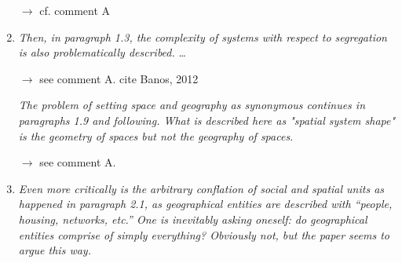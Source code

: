 \documentclass[11pt,a4paper,sans]{moderncv}        %
\begin{document}
\begin{enumerate}
 $\rightarrow$ cf. comment A
 
 \medskip

  

  \item \textit{Then, in paragraph 1.3, the complexity of systems with respect to segregation is also problematically described.} \ldots
  
  $\rightarrow$ see comment A. cite Banos, 2012 

  \medskip

  \textit{The problem of setting space and geography as synonymous continues in paragraphs 1.9 and following. What is described here as "spatial system shape" is the geometry of spaces but not the geography of spaces.}
  
  $\rightarrow$ see comment A. 

  \medskip

  \item \textit{Even more critically is the arbitrary conflation of social and spatial units as happened in paragraph 2.1, as geographical entities are described with “people, housing, networks, etc.” One is inevitably asking oneself: do geographical entities comprise of simply everything? Obviously not, but the paper seems to argue this way.}
  

\end{enumerate}
\end{document}

